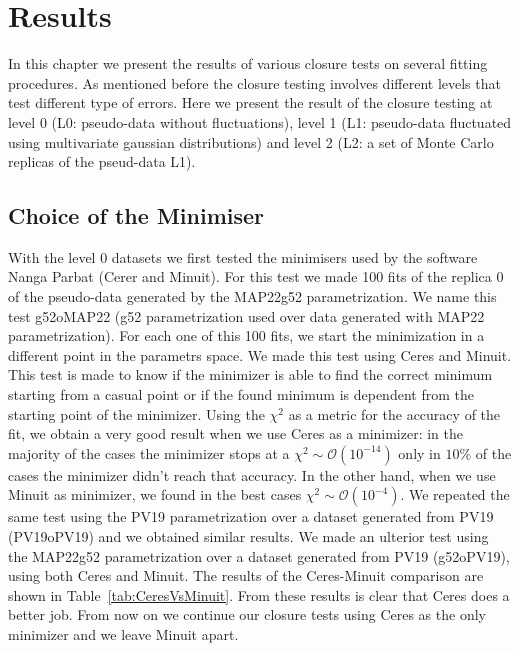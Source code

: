 \documentclass[12pt]{report}
\begin{document}
\chapter{Results}

In this chapter we present the results of various closure tests on several fitting procedures. As mentioned before the closure testing involves different levels that test different type of errors. Here we present the result of the closure testing at level 0 (L0: pseudo-data without fluctuations), level 1 (L1: pseudo-data fluctuated using multivariate gaussian distributions) and level 2 (L2: a set of Monte Carlo replicas of the pseud-data L1).

\section{Choice of the Minimiser}

With the level 0 datasets we first tested the minimisers used by the software Nanga Parbat (Cerer and Minuit). For this test we made 100 fits of the replica 0 of the pseudo-data generated by the MAP22g52 parametrization. We name this test g52oMAP22 (g52 parametrization used over data generated with MAP22 parametrization). For each one of this 100 fits, we start the minimization in a different point in the parametrs space. We made this test using Ceres and Minuit.
This test is made to know if the minimizer is able to find the correct minimum starting from a casual point or if the found minimum is dependent from the starting point of the minimizer. Using the $\chi^2$ as a metric for the accuracy of the fit, we obtain a very good result when we use Ceres as a minimizer: in the majority of the cases the minimizer stops at a $\chi^2 \sim \mathcal{O}(10^{-14})$ only in $10\%$ of the cases the minimizer didn't reach that accuracy. In the other hand, when we use Minuit as minimizer, we found in the best cases $\chi^2 \sim \mathcal{O}(10^{-4})$. We repeated the same test using the PV19 parametrization over a dataset generated from PV19 (PV19oPV19) and we obtained similar results. We made an ulterior test using the MAP22g52 parametrization over a dataset generated from PV19 (g52oPV19), using both Ceres and Minuit. The results of the Ceres-Minuit comparison are shown in Table~\ref{tab:CeresVsMinuit}. From these results is clear that Ceres does a better job. From now on we continue our closure tests using Ceres as the only minimizer and we leave Minuit apart. 
\end{document}
